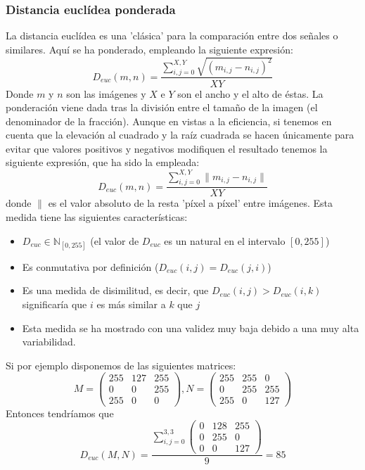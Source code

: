 \subsubsection{Distancia euclídea ponderada}
La distancia euclídea es una 'clásica' para la comparación entre dos señales o similares. Aquí se ha ponderado, empleando la siguiente expresión:
\[
D_{euc}(m,n)=\frac{\sum_{i,j=0}^{X,Y}{\sqrt{(m_{i,j}-n_{i,j})^2}}}{XY}
\]
Donde $m$ y $n$ son las imágenes y $X$ e $Y$ son el ancho y el alto de éstas. La ponderación viene dada tras la división entre el tamaño de la imagen (el denominador de la fracción). Aunque en vistas a la eficiencia, si tenemos en cuenta que la elevación al cuadrado y la raíz cuadrada se hacen únicamente para evitar que valores positivos y negativos modifiquen el resultado tenemos la siguiente expresión, que ha sido la empleada:
\[
D_{euc}(m,n)=\frac{\sum_{i,j=0}^{X,Y}{\parallel m_{i,j}-n_{i,j}\parallel}}{XY}
\]
donde $\parallel$ es el valor absoluto de la resta 'píxel a píxel' entre imágenes. Esta medida tiene las siguientes características:
\begin{itemize}
	\item{$D_{euc}\in\mathbb{N}_{\left[0,255\right]}$ (el valor de $D_{euc}$ es un natural en el intervalo $\left[0,255\right]$)} 
	\item{Es conmutativa por definición ($D_{euc}(i,j)=D_{euc}(j,i)$)}
	\item{Es una medida de disimilitud, es decir, que $D_{euc}(i,j) > D_{euc} (i,k)$ significaría que $i$ es más similar a $k$ que $j$}
	\item{Esta medida se ha mostrado con una validez muy baja debido a una muy alta variabilidad.}
\end{itemize}

Si por ejemplo disponemos de las siguientes matrices:
\[ M=\left( \begin{array}{lcr}
	255 & 127 & 255 \\
	0 & 0 & 255 \\
	255 & 0 & 0 
\end{array} \right), N=\left( \begin{array}{lcr}
	255 & 255 & 0 \\
	0 & 255 & 255 \\
	255 & 0 & 127 
\end{array} \right) 
\]
Entonces tendríamos que 
\[D_{euc}(M,N) = \frac
	{\sum_{i,j=0}^{3,3}\left( 
		\begin{array}{lcr}
			0 & 128 & 255\\ 0 & 255 & 0 \\ 0 & 0 & 127 
		\end{array} 
	\right)}
	{9} = 85
\]


